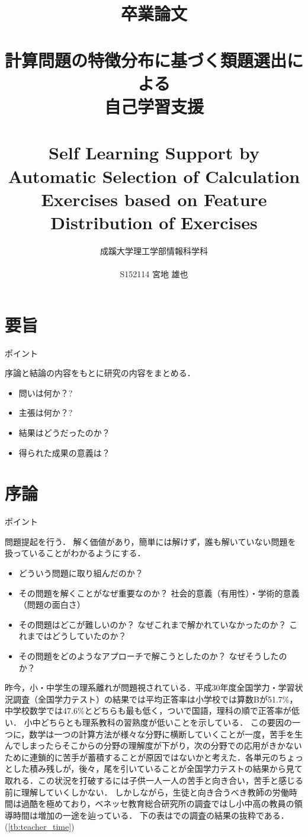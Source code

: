 \documentclass[a4j,11pt,report]{jsbook}
\title{卒業論文\\ \vspace{3em}\\{\huge #1}\\ \\#2\vspace{15em}}%
\author{{\huge 成蹊大学理工学部情報科学科}\\ \\{\huge #3}}%
\date{}
\newcommand{\frontpage}[3]{%
\title{卒業論文\\ \vspace{3em}\\{\huge #1}\\ \\#2\vspace{15em}}%
\author{{\huge 成蹊大学理工学部情報科学科}\\ \\{\huge #3}}%
\date{}
\maketitle
\clearpage
\thispagestyle{empty}

\clearpage
}
\newcommand{\point}[1]{
\begin{itembox}[l]{ポイント}
  #1
\end{itembox}
}
\begin{document}
\frontpage  %
{計算問題の特徴分布に基づく類題選出による\\自己学習支援}
{Self Learning Support by Automatic Selection of Calculation Exercises based on Feature Distribution of Exercises}
{S152114 宮地 雄也}

\chapter*{要旨}
\thispagestyle{empty}
\point{
序論と結論の内容をもとに研究の内容をまとめる．
\begin{itemize}
  \item 問いは何か？?
  \item 主張は何か？?
  \item 結果はどうだったのか？
  \item 得られた成果の意義は？
\end{itemize}
}
\fi
\tableofcontents
\thispagestyle{empty}
\clearpage
\thispagestyle{plain}
\setcounter{page}{1}

\chapter{序論 \label{ch:introduction}}

\point{
問題提起を行う．
解く価値があり，簡単には解けず，誰も解いていない問題を扱っていることがわかるようにする．
\begin{itemize}
  \item どういう問題に取り組んだのか？
  \item その問題を解くことがなぜ重要なのか？ 社会的意義（有用性）・学術的意義（問題の面白さ）
  \item その問題はどこが難しいのか？ なぜこれまで解かれていなかったのか？ これまではどうしていたのか？
  \item その問題をどのようなアプローチで解こうとしたのか？ なぜそうしたのか？
\end{itemize}
}
\fi

昨今，小・中学生の理系離れが問題視されている．平成30年度全国学力・学習状況調査（全国学力テスト）の結果では平均正答率は小学校では算数Bが51.7\%，中学校数学では47.6\%とどちらも最も低く，ついで国語，理科の順で正答率が低い．
小中どちらとも理系教科の習熟度が低いことを示している．
この要因の一つに，数学は一つの計算方法が様々な分野に横断していくことが一度，苦手を生んでしまったらそこからの分野の理解度が下がり，次の分野での応用がきかないために連鎖的に苦手が蓄積することが原因ではないかと考えた．各単元のちょっとした積み残しが，後々，尾を引いていることが全国学力テストの結果から見て取れる．この状況を打破するには子供一人一人の苦手と向き合い，苦手と感じる前に理解していくしかない．
しかしながら，生徒と向き合うべき教師の労働時間は過酷を極めており，ベネッセ教育総合研究所の調査ではし小中高の教員の領導時間は増加の一途を辿っている．\cite{benesse_DateBook}
下の表は\cite{benesse_DateBook}での調査の結果の抜粋である．(\ref{tb:teacher_time})
\end{document}
